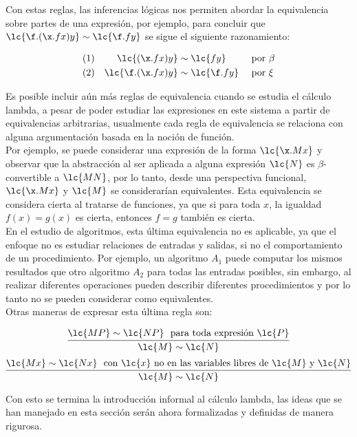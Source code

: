 Con estas reglas, las inferencias lógicas nos permiten abordar la equivalencia
sobre partes de una expresión, por ejemplo, para concluir que \(\lc{\f.(\x.f
  x)y} \sim \lc{\f.f y}\) se sigue el siguiente razonamiento:

\begin{align*}
  (1)& &\lc{(\x.f x)y} &\sim \lc{f y} & &\text{ por \(\beta\)} \\
  (2)& &\lc{\f.(\x.f x)y} &\sim \lc{\f.f y} & &\text{ por \(\xi\)}
\end{align*}

Es posible incluir aún más reglas de equivalencia cuando se estudia el cálculo
lambda, a pesar de poder estudiar las expresiones en este sistema a partir de
equivalencias arbitrarias, usualmente cada regla de equivalencia se relaciona
con alguna argumentación basada en la noción de función. \\

Por ejemplo, se puede considerar una expresión de la forma \(\lc{\x.M x}\) y
observar que la abstracción al ser aplicada a alguna expresión \(\lc{N}\) es
\(\beta\)-convertible a \(\lc{M N}\), por lo tanto, desde una perspectiva
funcional, \(\lc{\x.M x}\) y \(\lc{M}\) se considerarían equivalentes. Esta
equivalencia se considera cierta al tratarse de funciones, ya que si para toda \(x\),
la igualdad \(f(x) = g(x)\) es cierta, entonces \(f = g\) también es cierta. \\

En el estudio de algoritmos, esta última equivalencia no es aplicable, ya que el
enfoque no es estudiar relaciones de entradas y salidas, si no el comportamiento
de un procedimiento. Por ejemplo, un algoritmo \(A_{1}\) puede computar los
mismos resultados que otro algoritmo \(A_{2}\) para todas las entradas posibles,
sin embargo, al realizar diferentes operaciones pueden describir diferentes
procedimientos y por lo tanto no se pueden considerar como equivalentes. \\

Otras maneras de expresar esta última regla son:

\[\infer{\lc{M} \sim \lc{N}}{\lc{M P} \sim \lc{N P}\ \text{ para toda expresión
      \(\lc{P}\)}}\]
\[\infer{\lc{M} \sim \lc{N}}{\lc{M x} \sim \lc{N x}\ \text{ con \(\lc{x}\) no en las variables
      libres de \(\lc{M}\) y \(\lc{N}\)}}\]

Con esto se termina la introducción informal al cálculo lambda, las ideas que se
han manejado en esta sección serán ahora formalizadas y definidas de manera
rigurosa. \\

